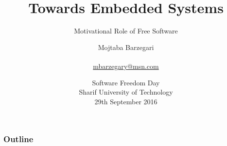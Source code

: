 \documentclass{beamer}
\title[Towards Embedded Systems]{Towards Embedded Systems}
\subtitle{Motivational Role of Free Software }
\author[Mojtaba Barzegari]{
 Mojtaba Barzegari \\\medskip
  {\small \url{}} \\ 
  {\small \url{mbarzegary@msn.com}}}
\institute[Tehran Software Freedom Day]{  }
\date[9/29/2016]
{
  Software Freedom Day\\
  Sharif University of Technology \\
  29th September 2016
}
\begin{document}
\begin{frame}
  \titlepage
\end{frame}

\begin{frame}
  \frametitle{Outline}
 \tableofcontents
\end{frame}








\end{document}
